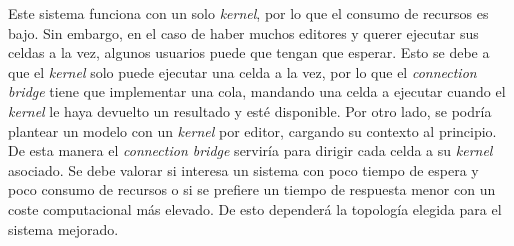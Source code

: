 \documentclass[11pt,spanish,listoffigures]{tfgetsinf}
\begin{document}
Este sistema funciona con un solo \textit{kernel}, por lo que el consumo de recursos es bajo. Sin embargo, en el caso de haber muchos editores y querer ejecutar sus celdas a la vez, algunos usuarios puede que tengan que esperar. Esto se debe a que el \textit{kernel} solo puede ejecutar una celda a la vez, por lo que el \textit{connection bridge} tiene que implementar una cola, mandando una celda a ejecutar cuando el \textit{kernel} le haya devuelto un resultado y esté disponible. Por otro lado, se podría plantear un modelo con un \textit{kernel} por editor, cargando su contexto al principio. De esta manera el \textit{connection bridge} serviría para dirigir cada celda a su \textit{kernel} asociado. Se debe valorar si interesa un sistema con poco tiempo de espera y poco consumo de recursos o si se prefiere un tiempo de respuesta menor con un coste computacional más elevado. De esto dependerá la topología elegida para el sistema mejorado.



\printglossary[title=Glosario]



\end{document}
